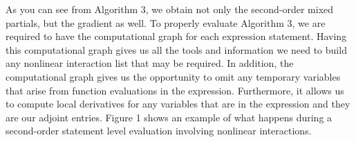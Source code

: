 \documentclass[oneside]{article}
\begin{document}
\begin{algorithm*}[!htb]
\begin{algorithmic}[1]
\EndIf
\EndFor
\end{algorithmic}
 \end{algorithm*}
 
As you can see from Algorithm 3, we obtain not only the second-order mixed partials, but the gradient as well.  To properly evaluate Algorithm 3, we are required to have the computational graph for each expression statement. Having this computational graph gives us all the tools and information we need to build any nonlinear interaction list that may be required. In addition, the computational graph gives us the opportunity to omit any temporary variables that arise from function evaluations in the expression. Furthermore, it allows us to compute local derivatives for any variables that are in the expression and they are our adjoint entries. Figure 1 shows an example of what happens during a second-order statement level evaluation involving nonlinear interactions. \\
\\
\end{document}
